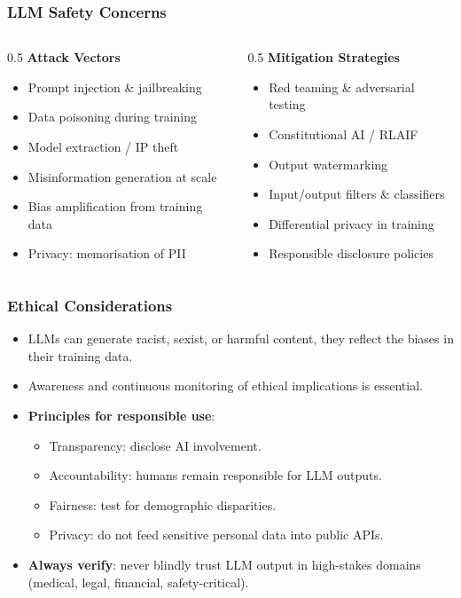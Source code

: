 \begin{frame}[fragile]\frametitle{LLM Safety Concerns}
\begin{columns}
  \begin{column}[T]{0.5\linewidth}
    \textbf{Attack Vectors}
    \begin{itemize}
    \item Prompt injection \& jailbreaking
    \item Data poisoning during training
    \item Model extraction / IP theft
    \item Misinformation generation at scale
    \item Bias amplification from training data
    \item Privacy: memorisation of PII
    \end{itemize}
  \end{column}
  \begin{column}[T]{0.5\linewidth}
    \textbf{Mitigation Strategies}
    \begin{itemize}
    \item Red teaming \& adversarial testing
    \item Constitutional AI / RLAIF
    \item Output watermarking
    \item Input/output filters \& classifiers
    \item Differential privacy in training
    \item Responsible disclosure policies
    \end{itemize}
  \end{column}
\end{columns}
\end{frame}

\begin{frame}[fragile]\frametitle{Ethical Considerations}
\begin{itemize}
\item LLMs can generate racist, sexist, or harmful content, they reflect the biases in their training data.
\item Awareness and continuous monitoring of ethical implications is essential.
\item \textbf{Principles for responsible use}:
  \begin{itemize}
  \item Transparency: disclose AI involvement.
  \item Accountability: humans remain responsible for LLM outputs.
  \item Fairness: test for demographic disparities.
  \item Privacy: do not feed sensitive personal data into public APIs.
  \end{itemize}
\item \textbf{Always verify}: never blindly trust LLM output in high-stakes domains (medical, legal, financial, safety-critical).
\end{itemize}
\end{frame}

